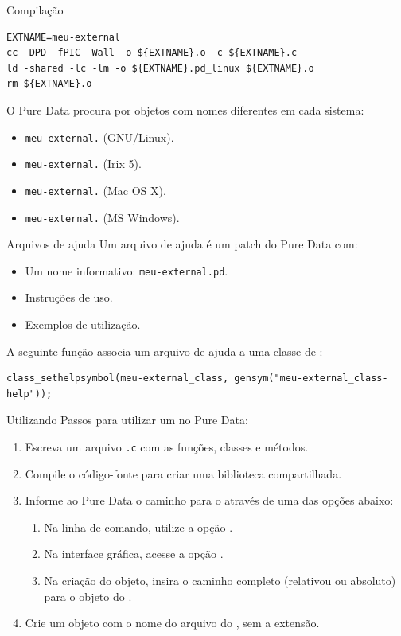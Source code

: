 \begin{frame}[fragile]{Compilação}
\begin{lstlisting}
EXTNAME=meu-external
cc -DPD -fPIC -Wall -o ${EXTNAME}.o -c ${EXTNAME}.c
ld -shared -lc -lm -o ${EXTNAME}.pd_linux ${EXTNAME}.o
rm ${EXTNAME}.o
\end{lstlisting}
O Pure Data procura por objetos com nomes diferentes em cada sistema:
\begin{itemize}
  \item \texttt{meu-external.} (GNU/Linux).
  \item \texttt{meu-external.} (Irix 5).
  \item \texttt{meu-external.} (Mac OS X).
  \item \texttt{meu-external.} (MS Windows).
\end{itemize}
\end{frame}


\begin{frame}[fragile]{Arquivos de ajuda}
Um arquivo de ajuda é um patch do Pure Data com:
\begin{itemize}
\item Um nome informativo: \texttt{meu-external.pd}.
\item Instruções de uso.
\item Exemplos de utilização.
\end{itemize}
\vspace{2em}
A seguinte função associa um arquivo de ajuda a uma classe de \external:
\begin{lstlisting}
class_sethelpsymbol(meu-external_class, gensym("meu-external_class-help"));
\end{lstlisting}
\end{frame}


\begin{frame}{Utilizando \externals}
Passos para utilizar um \external no Pure Data:
\begin{enumerate}
\item Escreva um arquivo \texttt{.c} com as funções, classes e métodos.
\item Compile o código-fonte para criar uma biblioteca compartilhada.
\item Informe ao Pure Data o caminho para o \external através de uma das
opções abaixo:
  \begin{enumerate}
    \item Na linha de comando, utilize a opção .
    \item Na interface gráfica, acesse a opção .
    \item Na criação do objeto, insira o caminho completo (relativou ou
    absoluto) para o objeto do \external.
  \end{enumerate}
\item Crie um objeto com o nome do arquivo do \external, sem a extensão.
\end{enumerate}
\end{frame}


